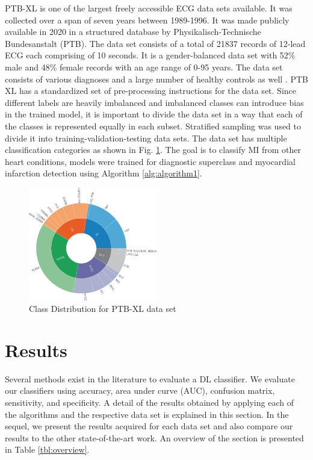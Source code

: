 \documentclass{ieeeaccess}
\begin{document}
PTB-XL is one of the largest freely accessible ECG data sets available. It was collected over a span of seven years between 1989-1996. It was made publicly available in 2020 in a structured database by Physikalisch-Technische Bundesanstalt (PTB). The data set consists of a total of 21837 records of 12-lead ECG each comprising of 10 seconds. It is a gender-balanced data set with 52\% male and 48\% female records with an age range of 0-95 years. The data set consists of various diagnoses and a large number of healthy controls as well \cite{9190034}. 
PTB XL has a standardized set of pre-processing instructions for the data set. Since different labels are heavily imbalanced and imbalanced classes can introduce bias in the trained model, it is important to divide the data set in a way that each of the classes is represented equally in each subset. Stratified sampling was used to divide it into training-validation-testing data sets. The data set has multiple classification categories as shown in Fig. \ref{fig:CD-ptbxl}. The goal is to classify MI from other heart conditions, models were trained for diagnostic superclass and myocardial infarction detection using Algorithm \ref{alg:algorithm1}.  

\begin{figure}[!ht]
\includegraphics[width=0.5\textwidth]{Definitions/ptb-xl.jpeg}
\caption{Class Distribution for PTB-XL data set}
\label{fig:CD-ptbxl}
\end{figure} 


\section{Results}

Several methods exist in the literature to evaluate a DL classifier. We evaluate our classifiers using accuracy, area under curve (AUC), confusion matrix, sensitivity, and specificity. A detail of the results obtained by applying each of the algorithms and the respective data set is explained in this section. 
In the sequel, we present the results acquired for each data set and also compare our results to the other state-of-the-art work. An overview of the section is presented in Table \ref{tbl:overview}.
\end{document}
